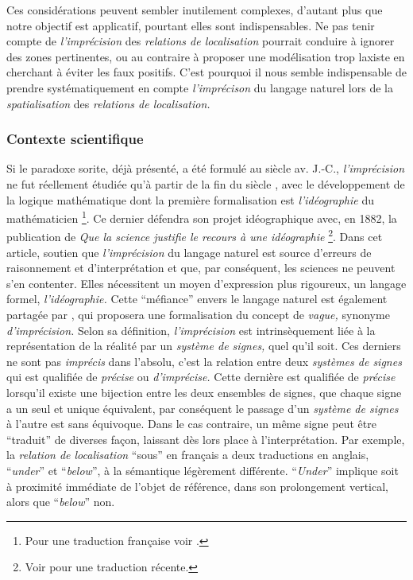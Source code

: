 
Ces considérations peuvent sembler inutilement complexes, d'autant
plus que notre objectif est applicatif, pourtant elles sont
indispensables. Ne pas tenir compte de \emph{l'imprécision} des
\emph{relations de localisation} pourrait conduire à ignorer des zones
pertinentes, ou au contraire à proposer une modélisation trop laxiste
en cherchant à éviter les faux positifs. C'est pourquoi il nous semble
indispensable de prendre systématiquement en compte
\emph{l'imprécison} du langage naturel lors de la
\emph{spatialisation} des \emph{relations de localisation.}

\subsubsection{Contexte scientifique}

Si le paradoxe sorite, déjà présenté, a été formulé au
 siècle av. J.-C., \emph{l'imprécision} ne fut
réellement étudiée qu'à partir de la fin du  siècle
\autocite{Williamson1994}, avec le développement de la logique
mathématique dont la première formalisation est \emph{l'idéographie}
du mathématicien \textcite{Frege1879} \footnote{Pour une traduction
  française voir \textcite{Frege1999}.}. Ce dernier défendra son
projet idéographique avec, en 1882, la publication de \emph{Que la
  science justifie le recours à une idéographie} \autocite{Frege1882}
\footnote{Voir \textcite{Frege2019} pour une traduction
  récente.}. Dans cet article,  soutien que
\emph{l'imprécision} du langage naturel est source d'erreurs de
raisonnement et d'interprétation et que, par conséquent, les sciences
ne peuvent s'en contenter. Elles nécessitent un moyen d'expression
plus rigoureux, un langage formel, \emph{l'idéographie.} Cette
\enquote{méfiance} envers le langage naturel est également partagée
par \textcite{Russell1923}, qui proposera une formalisation du concept
de \emph{vague,} synonyme \emph{d'imprécision.} Selon sa définition,
\emph{l'imprécision} est intrinsèquement liée à la représentation de
la réalité par un \emph{système de signes,} quel qu'il soit. Ces
derniers ne sont pas \emph{imprécis} dans l'absolu, c'est la relation
entre deux \emph{systèmes de signes} qui est qualifiée de
\emph{précise} ou \emph{d'imprécise.} Cette dernière est qualifiée de
\emph{précise} lorsqu'il existe une bijection entre les deux ensembles
de signes, \ie que chaque signe a un seul et unique équivalent, par
conséquent le passage d'un \emph{système de signes} à l'autre est sans
équivoque. Dans le cas contraire, un même signe peut être
\enquote{traduit} de diverses façon, laissant dès lors place à
l'interprétation. Par exemple, la \emph{relation de localisation}
\enquote{sous} en français a deux traductions en anglais,
\enquote{\emph{under}} et \enquote{\emph{below}}, à la sémantique
légèrement différente. \enquote{\emph{Under}} implique soit à
proximité immédiate de l'objet de référence, dans son prolongement
vertical, alors que \enquote{\emph{below}} non.

